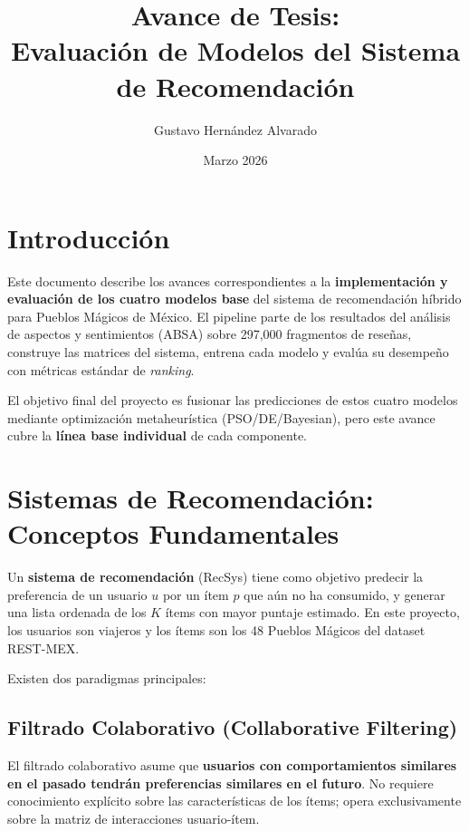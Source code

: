 \documentclass[11pt, a4paper]{article}
\title{Avance de Tesis:\\Evaluación de Modelos del Sistema de Recomendación}
\author{Gustavo Hernández Alvarado}
\date{Marzo 2026}
\begin{document}
\maketitle
\newpage

\section{Introducción}

Este documento describe los avances correspondientes a la \textbf{implementación y evaluación de los cuatro modelos base} del sistema de recomendación híbrido para Pueblos Mágicos de México. El pipeline parte de los resultados del análisis de aspectos y sentimientos (ABSA) sobre 297,000 fragmentos de reseñas, construye las matrices del sistema, entrena cada modelo y evalúa su desempeño con métricas estándar de \textit{ranking}.

El objetivo final del proyecto es fusionar las predicciones de estos cuatro modelos mediante optimización metaheurística (PSO/DE/Bayesian), pero este avance cubre la \textbf{línea base individual} de cada componente.

\section{Sistemas de Recomendación: Conceptos Fundamentales}

Un \textbf{sistema de recomendación} (RecSys) tiene como objetivo predecir la preferencia de un usuario $u$ por un ítem $p$ que aún no ha consumido, y generar una lista ordenada de los $K$ ítems con mayor puntaje estimado. En este proyecto, los usuarios son viajeros y los ítems son los 48 Pueblos Mágicos del dataset REST-MEX.

Existen dos paradigmas principales:

\subsection{Filtrado Colaborativo (Collaborative Filtering)}

El filtrado colaborativo asume que \textbf{usuarios con comportamientos similares en el pasado tendrán preferencias similares en el futuro}. No requiere conocimiento explícito sobre las características de los ítems; opera exclusivamente sobre la matriz de interacciones usuario-ítem.
\end{document}
